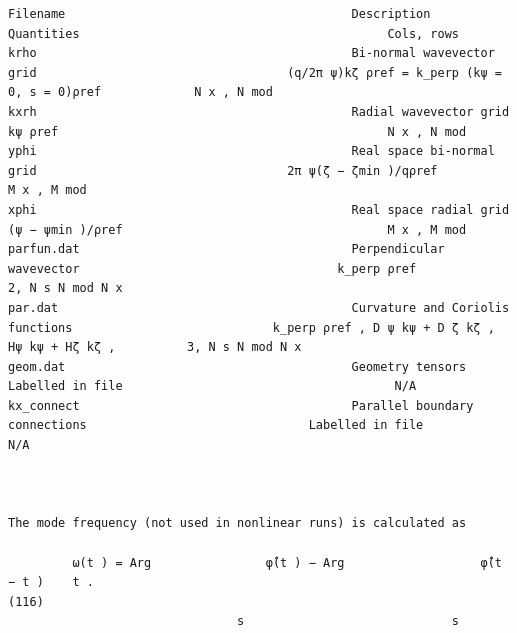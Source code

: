 \documentclass[a4paper]{article}
\newcommand{\gkwpagefont}{\fontsize{6.0pt}{7.55pt}\selectfont}
\begin{document}
\begin{Verbatim}[fontsize=\gkwpagefont]
Filename                                        Description                                                 Quantities                                           Cols, rows
krho                                            Bi-normal wavevector grid                                   (q/2π ψ)kζ ρref = k_perp (kψ = 0, s = 0)ρref             N x , N mod
kxrh                                            Radial wavevector grid                                      kψ ρref                                              N x , N mod
yphi                                            Real space bi-normal grid                                   2π ψ(ζ − ζmin )/qρref                                M x , M mod
xphi                                            Real space radial grid                                      (ψ − ψmin )/ρref                                     M x , M mod
parfun.dat                                      Perpendicular wavevector                                    k_perp ρref                                              2, N s N mod N x
par.dat                                         Curvature and Coriolis functions                            k_perp ρref , D ψ kψ + D ζ kζ , Hψ kψ + Hζ kζ ,          3, N s N mod N x
geom.dat                                        Geometry tensors                                            Labelled in file                                      N/A
kx_connect                                      Parallel boundary connections                               Labelled in file                                      N/A



The mode frequency (not used in nonlinear runs) is calculated as
                                                                          
         ω(t ) = Arg                φ̂(t ) − Arg                   φ̂(t − t )    t .                                                                                    (116)
                                s                             s


\end{Verbatim}
\end{document}
